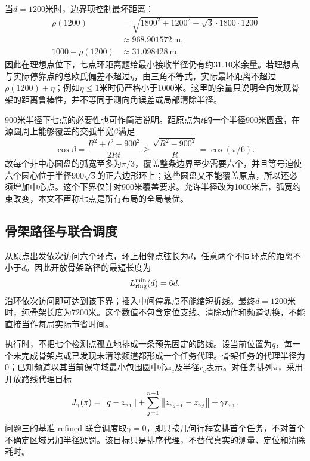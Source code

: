 当$d=1200$米时，边界项控制最坏距离：
\begin{equation}
\begin{aligned}
 \rho(1200)&=\sqrt{1800^2+1200^2-\sqrt3\cdot1800\cdot1200}\\
 &\approx968.901572\ \mathrm m,\\
 1000-\rho(1200)&\approx31.098428\ \mathrm m.
\end{aligned}
 \label{new:eq-ring-margin}
\end{equation}
因此在理想点位下，七点环距离题给最小接收半径仍有约$31.10$米余量。若理想点与实际停靠点的总欧氏偏差不超过$\eta$，由三角不等式，实际最坏距离不超过$\rho(1200)+\eta$；例如$\eta\le1$米时仍严格小于1000米。这里的余量只说明全向发现骨架的距离鲁棒性，并不等同于测向角误差或局部清除半径。

900米半径下七点的必要性也可作简洁说明。距原点为$t$的一个半径900米圆盘，在源圆周上能够覆盖的交弧半宽$\beta$满足
\[
 \cos\beta=\frac{R^2+t^2-900^2}{2Rt}
 \ge\frac{\sqrt{R^2-900^2}}R=\cos(\pi/6).
\]
故每个非中心圆盘的弧宽至多为$\pi/3$，覆盖整条边界至少需要六个，并且等号迫使六个圆心位于半径$900\sqrt3$的正六边形环上；这些圆盘又不能覆盖原点，所以还必须增加中心点。这个下界仅针对900米覆盖要求。允许半径改为1000米后，弧宽约束改变，本文不声称七点是所有布局的全局最优。

\subsection{骨架路径与联合调度}
从原点出发依次访问六个环点，环上相邻点弦长为$d$，任意两个不同环点的距离不小于$d$。因此开放骨架路径的最短长度为
\begin{equation}
 L_{\rm ring}^{\min}(d)=6d.
 \label{new:eq-ring-path}
\end{equation}
沿环依次访问即可达到该下界；插入中间停靠点不能缩短折线。最终$d=1200$米时，纯骨架长度为7200米。这个数值不包含定位支线、清除动作和频道切换，不能直接当作每局实际节省时间。

执行时，不把七个检测点孤立地排成一条预先固定的路线。设当前位置为$q$，每一个未完成骨架点或已发现未清除频道都形成一个任务代理。骨架任务的代理半径为0；已知频道以其当前保守域最小包围圆中心$z_c$及半径$r_c$表示。对任务排列$\pi$，采用开放路线代理目标
\begin{equation}
 J_\gamma(\pi)=\left\lVert q-z_{\pi_1}\right\rVert+
 \sum_{j=1}^{n-1}\left\lVert z_{\pi_{j+1}}-z_{\pi_j}\right\rVert+\gamma r_{\pi_1}.
 \label{new:eq-route-proxy}
\end{equation}
问题三的基准 refined 联合调度取$\gamma=0$，即只按几何行程安排首个任务，不对首个不确定区域另加半径惩罚。该目标只是排序代理，不替代真实的测量、定位和清除耗时。

